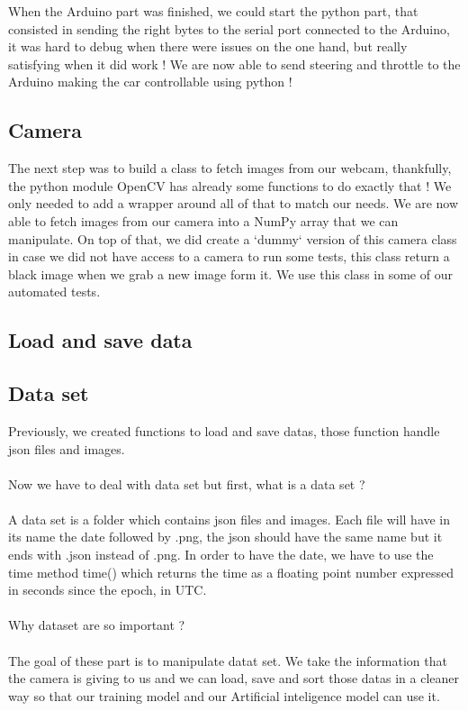 \documentclass[12pt]{article}
\begin{document}
When the Arduino part was finished, we could start the python part, that consisted in sending the right bytes to the serial port connected to the Arduino, it was hard to debug when there were issues on the one hand, but really satisfying when it did work ! We are now able to send steering and throttle to the Arduino making the car controllable using python !

\subsection{Camera}
The next step was to build a class to fetch images from our webcam, thankfully, the python module OpenCV has already some functions to do exactly that ! 
We only needed to add a wrapper around all of that to match our needs. We are now able to fetch images from our camera into a NumPy array that we can manipulate. On top of that, we did create a `dummy` version of this camera class in case we did not have access to a camera to run some tests, this class return a black image when we grab a new image form it. We use this class in some of our automated tests.

\subsection{Load and save data}

\subsection{Data set}
Previously, we created functions to load and save datas, those function handle json files and images. \\ \\
Now we have to deal with data set but first, what is a data set ? \\ \\
A data set is a folder which contains json files and images. Each file will have in its name the date followed by .png, the json should have the same name but it ends with .json instead of .png. In order to have the date, we have to use the time method time() which returns the time as a floating point number expressed in seconds since the epoch, in UTC.\\ \\

Why dataset are so important ? \\ \\ 
The goal of these part is to manipulate datat set. We take the information that the camera is giving to us and we can load, save and sort those datas in a cleaner way so that our training model and our Artificial inteligence model can use it.\\ \\
\end{document}

